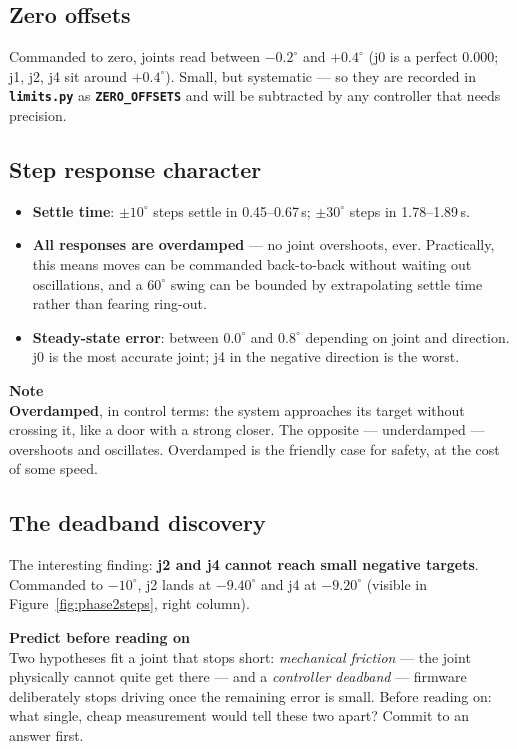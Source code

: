 \documentclass[11pt,twoside,openright]{book}
\newcommand{\code}[1]{\texttt{\bfseries #1}}
\newenvironment{pktnote}{\begin{pktbox}\textbf{Note}\\[4pt]}{\end{pktbox}}
\newenvironment{pktpredict}{\begin{pktpredictbox}\textbf{\color{accentorange}Predict before reading on}\\[4pt]}{\end{pktpredictbox}}
\begin{document}
\subsection{Zero offsets}

Commanded to zero, joints read between $-0.2^\circ$ and $+0.4^\circ$
(j0 is a perfect $0.000$; j1, j2, j4 sit around $+0.4^\circ$). Small, but
systematic --- so they are recorded in \code{limits.py} as
\code{ZERO\_OFFSETS} and will be subtracted by any controller that needs
precision.

\subsection{Step response character}

\begin{itemize}
  \item \textbf{Settle time}: $\pm10^\circ$ steps settle in
    0.45--0.67\,s; $\pm30^\circ$ steps in 1.78--1.89\,s.
  \item \textbf{All responses are overdamped} --- no joint overshoots,
    ever. Practically, this means moves can be commanded back-to-back
    without waiting out oscillations, and a $60^\circ$ swing can be
    bounded by extrapolating settle time rather than fearing ring-out.
  \item \textbf{Steady-state error}: between $0.0^\circ$ and
    $0.8^\circ$ depending on joint and direction. j0 is the most accurate
    joint; j4 in the negative direction is the worst.
\end{itemize}

\begin{pktnote}
\textbf{Overdamped}, in control terms: the system approaches its target
without crossing it, like a door with a strong closer. The opposite ---
underdamped --- overshoots and oscillates. Overdamped is the friendly case
for safety, at the cost of some speed.
\end{pktnote}

\subsection{The deadband discovery}

The interesting finding: \textbf{j2 and j4 cannot reach small negative
targets}. Commanded to $-10^\circ$, j2 lands at $-9.40^\circ$ and j4 at
$-9.20^\circ$ (visible in Figure~\ref{fig:phase2steps}, right column).

\begin{pktpredict}
Two hypotheses fit a joint that stops short: \emph{mechanical friction}
--- the joint physically cannot quite get there --- and a
\emph{controller deadband} --- firmware deliberately stops driving once
the remaining error is small. Before reading on: what single, cheap
measurement would tell these two apart? Commit to an answer first.
\end{pktpredict}
\end{document}
